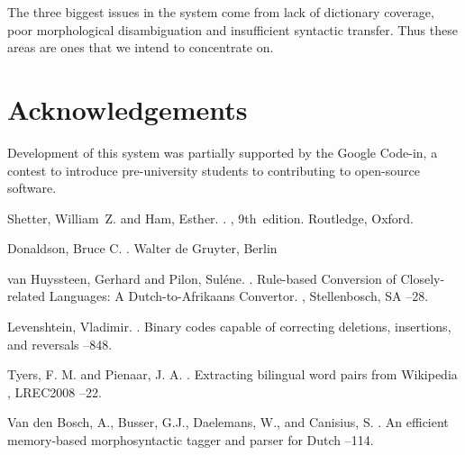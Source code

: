 \documentclass[11pt]{article}
\newcommand{\confname}{EAMT 2011}
\begin{document}
The three biggest issues in the system come from lack of dictionary coverage, poor morphological
disambiguation and insufficient syntactic transfer. Thus these areas are ones that we intend to 
concentrate on.

\section*{Acknowledgements}

Development of this system was partially supported by the Google Code-in,
a contest to introduce pre-university students to contributing to open-source
software.

% 

\begin{thebibliography}{}

Shetter, William~Z. and Ham, Esther.
.
, 9th~edition.
\newblock Routledge, Oxford.

Donaldson, Bruce C.
.
\newblock Walter de Gruyter, Berlin

van Huyssteen, Gerhard and Pilon, Suléne.
. 
\newblock Rule-based Conversion of Closely-related Languages: A Dutch-to-Afrikaans Convertor. 
, Stellenbosch, SA
--28.

Levenshtein, Vladimir.
. 
\newblock Binary codes capable of correcting deletions, insertions, and reversals
--848.

Tyers, F. M. and Pienaar, J. A.
. 
\newblock Extracting bilingual word pairs from Wikipedia
, LREC2008
--22. 

Van den Bosch, A., Busser, G.J., Daelemans, W., and Canisius, S.
. 
\newblock An efficient memory-based morphosyntactic tagger and parser for Dutch
--114.


\end{thebibliography}
\end{document}
